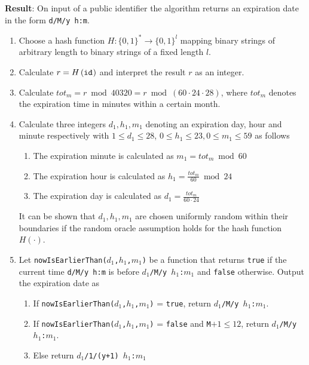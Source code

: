 \begin{algorithm}
\begin{description}
 \item \textbf{Result}: On input of a public identifier \id{} the algorithm returns an expiration date in the form \texttt{d/M/y h:m}.
\end{description}
 \begin{enumerate}
  \item Choose a hash function $H: \{ 0, 1 \}^* \rightarrow \{ 0,1 \}^l$ mapping binary strings of arbitrary length to binary strings of a fixed length $l$.
  \item Calculate $r = H \left( \mathtt{id}_{} \right)$ and interpret the result $r$ as an integer.
  \item Calculate $tot_m = r \bmod 40320 = r \bmod \left( 60 \cdot 24 \cdot 28 \right)$, where $tot_m$ denotes the expiration time in minutes within a certain month.
  \item Calculate three integers $d_1, h_1, m_1$ denoting an expiration day, hour and minute respectively with $1 \leq d_1 \leq 28$, $0 \leq h_1 \leq 23, 0 \leq m_1 \leq 59$ as follows 
  \begin{enumerate}
   \item The expiration minute is calculated as $m_1 = tot_m \bmod 60$
   \item The expiration hour is calculated as $h_1 = \frac{tot_m}{60} \bmod 24$
   \item The expiration day is calculated as $d_1 = \frac{tot_m}{60 \cdot 24}$
  \end{enumerate}
  It can be shown that $d_1, h_1, m_1$ are chosen uniformly random within their boundaries if the random oracle assumption holds for the hash function $H \left( \cdot \right)$.
  \item Let \texttt{nowIsEarlierThan($d_1$,$h_1$,$m_1$)} be a function that returns \texttt{true} if the current time \texttt{d/M/y h:m} is before \texttt{$d_1$/M/y $h_1$:$m_1$} and \texttt{false} otherwise. Output the expiration date as
  \begin{enumerate}
   \item If \texttt{nowIsEarlierThan($d_1$,$h_1$,$m_1$)} = \texttt{true}, return \texttt{$d_1$/M/y $h_1$:$m_1$}.
   \item If \texttt{nowIsEarlierThan($d_1$,$h_1$,$m_1$)} = \texttt{false} and \texttt{M}$+1 \leq 12$, return \texttt{$d_1$/M/y $h_1$:$m_1$}.
   \item Else return \texttt{$d_1$/1/(y+1) $h_1$:$m_1$}
  \end{enumerate}
 \end{enumerate}
\end{algorithm}


